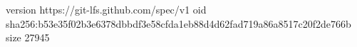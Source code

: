 version https://git-lfs.github.com/spec/v1
oid sha256:b53e35f02b3e6378dbbdf3e58cfda1eb88d4d62fad719a86a8517c20f2de766b
size 27945
